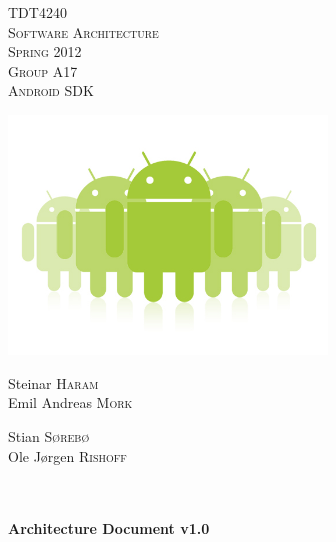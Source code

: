 \begin{titlepage}

\begin{center}

\textsc{\Large TDT4240}\\[1.0cm]

\textsc{\LARGE Software Architecture}\\[1.0cm]

\textsc{\Large Spring 2012}\\[1.0cm]

\textsc{Group A17} \\
\textsc{Android SDK}

\includegraphics[width=240pt]{./androids}\\[0.5cm]   

\begin{minipage}{0.4\textwidth}
\begin{flushleft} \large

Steinar \textsc{Haram}\\
Emil Andreas \textsc{Mork}\\

\end{flushleft}
\end{minipage}
\begin{minipage}{0.4\textwidth}
\begin{flushright} \large

Stian \textsc{Sørebø}\\
Ole Jørgen \textsc{Rishoff}

\end{flushright}
\end{minipage}\\[1.0cm]

\HRule \\[0.4cm]
{ \huge \bfseries Architecture Document v1.0}\\[0.4cm]
\HRule \\[1.5cm]


\end{center}
\end{titlepage}
